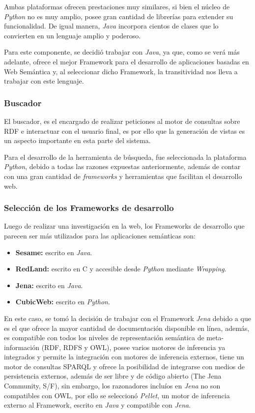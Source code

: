 Ambas plataformas ofrecen prestaciones muy similares, si bien el núcleo de \textit{Python} no es muy amplio, posee gran cantidad de librerías para extender su funcionalidad. De igual manera, \textit{Java} incorpora cientos de clases que lo convierten en un lenguaje amplio y poderoso.

Para este componente, se decidió trabajar con \textit{Java}, ya que, como se verá más adelante, ofrece el mejor Framework para el desarrollo de aplicaciones basadas en Web Semántica y, al seleccionar dicho Framework, la transitividad nos lleva a trabajar con este lenguaje.

\subsubsection{Buscador}
El buscador, es el encargado de realizar peticiones al motor de consultas sobre RDF e interactuar con el usuario final, es por ello que la generación de vistas es un aspecto importante en esta parte del sistema.

Para el desarrollo de la herramienta de búsqueda, fue seleccionada la plataforma \textit{Python}, debido a todas las razones expuestas anteriormente, además de contar con una gran cantidad de \textit{frameworks} y herramientas que facilitan el desarrollo web.

\subsubsection{Selección de los Frameworks de desarrollo}
Luego de realizar una investigación en la web, los Frameworks de desarrollo que parecen ser más utilizados para las aplicaciones semánticas son:

\begin{itemize}
    \item \textbf{Sesame:} escrito en \textit{Java}.
    \item \textbf{RedLand:} escrito en C y accesible desde \textit{Python} mediante \textit{Wrapping}.
    \item \textbf{Jena:} escrito en \textit{Java}.
    \item \textbf{CubicWeb:} escrito en \textit{Python}.
\end{itemize}

En este caso, se tomó la decisión de trabajar con el Framework \textit{Jena} debido a que es el que ofrece la mayor cantidad de documentación disponible en línea, además, es compatible con todos los niveles de representación semántica de meta-información (RDF, RDFS y OWL), posee varios motores de inferencia ya integrados y permite la integración con motores de inferencia externos, tiene un motor de consultas SPARQL y ofrece la posibilidad de integrarse con medios de persistencia externos, además de ser libre y de código abierto (The Jena Community, S/F), sin embargo, los razonadores incluíos en \textit{Jena} no son compatibles con OWL, por ello se seleccionó \textit{Pellet}, un motor de inferencia externo al Framework, escrito en \textit{Java} y compatible con \textit{Jena}.

